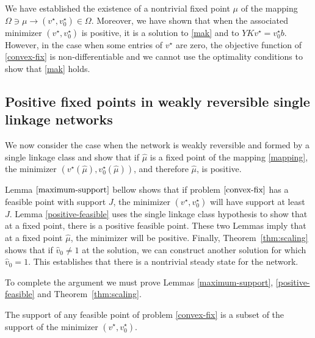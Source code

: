 \documentclass[smallextended]{svjour3}       %
\newcommand*{\0}{\mathbf{0}}
\newcommand*{\1}{\mathbf{1}}
\begin{document}
We have established the existence of a nontrivial fixed point $\mu$ of the
mapping $\Omega \ni \mu \rightarrow (v^\star,v^\star_0)\in \Omega$. Moreover,
we have shown that when the associated minimizer $(v^\star,v^\star_0)$ is
positive, it is a solution to \eqref{mak} and to
$YKv^\star=v^\star_0b$.  However, in the case when some entries of $v^\star$
are zero, the objective function of \eqref{convex-fix} is non-differentiable
and we cannot use the optimality conditions to show that \eqref{mak} holds. 


\subsection{Positive fixed points in weakly reversible single linkage networks}  
\label{section:single-linkage}

We now consider the case when the network is weakly reversible and formed by a single
linkage class and show that if $\hat \mu$ is a fixed point of the
mapping \eqref{mapping}, the minimizer $(v^\star(\hat
\mu),v^\star_0(\hat\mu))$, and therefore $\hat\mu$, is positive.

Lemma $\ref{maximum-support}$ bellow shows that if problem $\eqref{convex-fix}$ has a
feasible point with support $J$, the minimizer $(v^\star,v^\star_0)$ will have
support at least $J$. Lemma \ref{positive-feasible} uses the single
linkage class hypothesis to show that at a fixed point, there is a
positive feasible point.  These two Lemmas imply that at a fixed point
$\hat{\mu}$, the minimizer will be positive.  Finally, Theorem~\ref{thm:scaling}
shows that if $\hat{v}_0 \neq 1$ at the solution, we can construct another
solution for which $\hat{v}_0=1$. This establishes that there is a nontrivial
steady state for the network. 

To complete the argument we must prove Lemmas \ref{maximum-support},
\ref{positive-feasible} and Theorem~\ref{thm:scaling}.

\begin{lemma} 
	The support of any feasible point of problem \eqref{convex-fix} is a subset
	of the support of the minimizer $(v^\star,v^\star_0)$. 
	\label{maximum-support}
\end{lemma}
\end{document}
